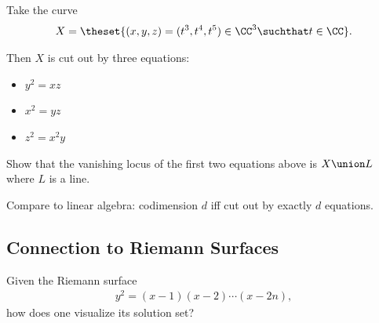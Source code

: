 \begin{example}

Take the curve
\begin{align*}  
X = \theset{(x, y, z) = (t^3, t^4, t^5) \in \CC^3 \suchthat t\in \CC}
.\end{align*}

Then \(X\) is cut out by three equations:

\begin{itemize}
\tightlist
\item
  \(y^2 = xz\)
\item
  \(x^2 = yz\)
\item
  \(z^2 = x^2 y\)
\end{itemize}

\end{example}

\begin{exercise}

Show that the vanishing locus of the first two equations above is
\(X\union L\) where \(L\) is a line.

\end{exercise}

Compare to linear algebra: codimension \(d\) iff cut out by exactly
\(d\) equations.

\hypertarget{connection-to-riemann-surfaces}{%
\subsection{Connection to Riemann
Surfaces}\label{connection-to-riemann-surfaces}}

\begin{example}

Given the Riemann surface
\begin{align*}  
y^2 = (x-1)(x-2)\cdots(x-2n)
,\end{align*} how does one visualize its solution set?

\end{example}

